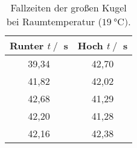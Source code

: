 \begin{table}[H]
  \centering
      \caption{Fallzeiten der großen Kugel bei Raumtemperatur ($\SI{19}{\celsius})$.}
      \label{tab:grKugRaum}
      \begin{tabular}{c c}
      \toprule
      Runter $t\:/\:$ s & Hoch $t\:/\:$ s\\
      \midrule
        39,34 & 42,70 \\
        41,82 & 42,02 \\
        42,68 & 41,29 \\
        42,20 & 41,28 \\
        42,16 & 42,38 \\
      \bottomrule
  \end{tabular}
\end{table}